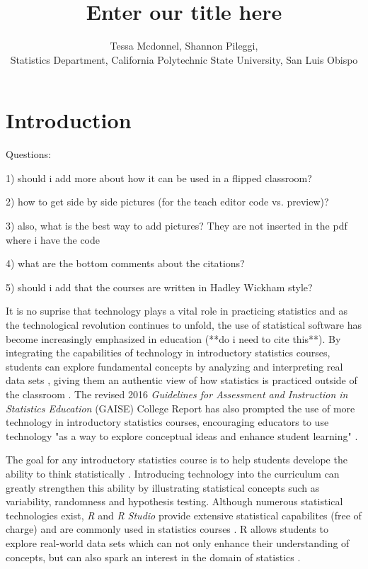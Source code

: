 \documentclass[12pt]{article}
\title{Enter our title here}
\author{Tessa Mcdonnel, Shannon Pileggi,  \\Statistics Department, California Polytechnic State University, San Luis Obispo}
\begin{document}
\maketitle

\section{Introduction}

Questions: 

1) should i add more about how it can be used in a flipped classroom?

2) how to get side by side pictures (for the teach editor code vs. preview)?

3) also, what is the best way to add pictures? They are not inserted in the pdf where i have the code

4) what are the bottom comments about the citations?

5) should i add that the courses are written in Hadley Wickham style?

It is no suprise that technology plays a vital role in practicing statistics and as the technological revolution continues to
unfold, the use of statistical software has become increasingly emphasized in education (**do i need to cite this**). By integrating the
capabilities of technology in introductory statistics courses, students can explore fundamental concepts by analyzing and
interpreting real data sets \cite{Chance2007, Hardin2015, Horton2014}, giving them an authentic view of how statistics is practiced outside of the
classroom \cite{Wang2017}. The revised 2016 \textit{Guidelines for Assessment and Instruction in Statistics Education}
(GAISE) College Report has also prompted the use of more technology in introductory statistics courses, encouraging educators
to use technology "as a way to explore conceptual ideas and enhance student learning" \cite{AmericanStatisticalAssociation2016}.

The goal for any introductory statistics course is to help students develope the ability to think statistically
\cite{AmericanStatisticalAssociation2016}.
Introducing technology into the curriculum can greatly strengthen this ability by illustrating statistical concepts such as
variability, randomness and hypothesis testing. Although numerous statistical technologies exist, \textit{R} and \textit{R Studio}
provide extensive statistical capabilites (free of charge) and are commonly used in statistics courses \cite{Chance2007}. R
allows students to explore real-world data sets which can not only enhance their understanding of concepts, but can also spark
an interest in the domain of statistics \cite{Wang2017}.
\end{document}

